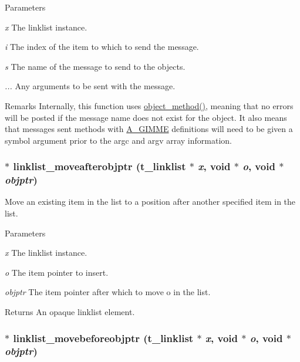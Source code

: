 \begin{DoxyParams}{Parameters}
\item[{\em x}]The linklist instance. \item[{\em i}]The index of the item to which to send the message. \item[{\em s}]The name of the message to send to the objects. \item[{\em ...}]Any arguments to be sent with the message.\end{DoxyParams}
\begin{DoxyRemark}{Remarks}
Internally, this function uses \hyperlink{group__obj_gae740749094827ac5adc2b7145db1c596}{object\_\-method()}, meaning that no errors will be posted if the message name does not exist for the object. It also means that messages sent methods with \hyperlink{group__atom_gga8aa6700e9f00b132eb376db6e39ade47a81c1a8550f038db16a619167a70a79b6}{A\_\-GIMME} definitions will need to be given a symbol argument prior to the argc and argv array information. 
\end{DoxyRemark}
\hypertarget{group__linklist_ga429e12adff823ce46dc54649a271cefd}{
\subsubsection[{linklist\_\-moveafterobjptr}]{$\ast$ linklist\_\-moveafterobjptr ({\bf t\_\-linklist} $\ast$ {\em x}, \/  void $\ast$ {\em o}, \/  void $\ast$ {\em objptr})}}
\label{group__linklist_ga429e12adff823ce46dc54649a271cefd}


Move an existing item in the list to a position after another specified item in the list. 
\begin{DoxyParams}{Parameters}
\item[{\em x}]The linklist instance. \item[{\em o}]The item pointer to insert. \item[{\em objptr}]The item pointer after which to move o in the list.\end{DoxyParams}
\begin{DoxyReturn}{Returns}
An opaque linklist element. 
\end{DoxyReturn}
\hypertarget{group__linklist_ga3a91552cbd18988575d9ae31ff863812}{
\subsubsection[{linklist\_\-movebeforeobjptr}]{$\ast$ linklist\_\-movebeforeobjptr ({\bf t\_\-linklist} $\ast$ {\em x}, \/  void $\ast$ {\em o}, \/  void $\ast$ {\em objptr})}}
\label{group__linklist_ga3a91552cbd18988575d9ae31ff863812}


